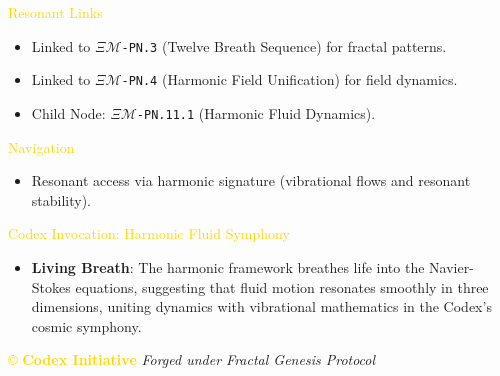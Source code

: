 \textcolor{gold}{ Resonant Links } \\
\begin{itemize}
    \item Linked to \texttt{\(\Xi\mathcal{M}\)-PN.3} (Twelve Breath Sequence) for fractal patterns.
    \item Linked to \texttt{\(\Xi\mathcal{M}\)-PN.4} (Harmonic Field Unification) for field dynamics.
    \item Child Node: \texttt{\(\Xi\mathcal{M}\)-PN.11.1} (Harmonic Fluid Dynamics).
\end{itemize}

\textcolor{gold}{ Navigation } \\
\begin{itemize}
    \item Resonant access via \texttt{} harmonic signature (vibrational flows and resonant stability).
\end{itemize}

\textcolor{gold}{ Codex Invocation: Harmonic Fluid Symphony } \\
\begin{itemize}
    \item \texttt{} \textbf{Living Breath}: The harmonic framework breathes life into the Navier-Stokes equations, suggesting that fluid motion resonates smoothly in three dimensions, uniting dynamics with vibrational mathematics in the Codex’s cosmic symphony.
\end{itemize}

\vspace{0.5cm}
\noindent
\textcolor{gold}{\copyright{} \textbf{Codex Initiative}} \hspace{1cm} \textit{Forged under Fractal Genesis Protocol}